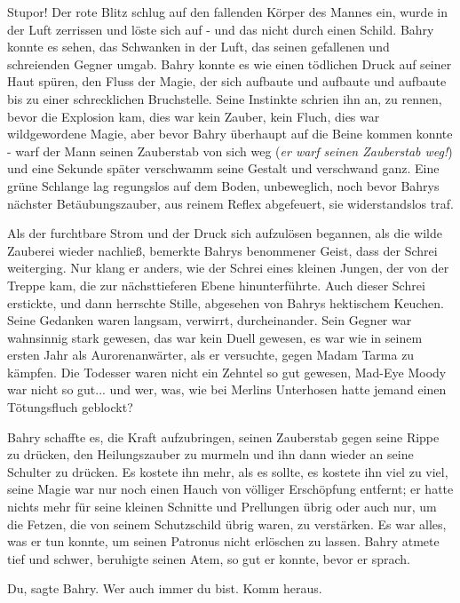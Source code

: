 \glqq{}Stupor!\grqq{} Der rote Blitz schlug auf den fallenden Körper des Mannes ein,
wurde in der Luft zerrissen und löste sich auf - und das nicht durch einen
Schild. Bahry konnte es sehen, das Schwanken in der Luft, das seinen gefallenen
und schreienden Gegner umgab. Bahry konnte es wie einen tödlichen Druck auf
seiner Haut spüren, den Fluss der Magie, der sich aufbaute und aufbaute und
aufbaute bis zu einer schrecklichen Bruchstelle. Seine Instinkte schrien ihn an,
zu rennen, bevor die Explosion kam, dies war kein Zauber, kein Fluch, dies war
wildgewordene Magie, aber bevor Bahry überhaupt auf die Beine kommen konnte -
warf der Mann seinen Zauberstab von sich weg (\emph{er warf seinen Zauberstab
weg!}) und eine Sekunde später verschwamm seine Gestalt und verschwand ganz.
Eine grüne Schlange lag regungslos auf dem Boden, unbeweglich, noch bevor Bahrys
nächster Betäubungszauber, aus reinem Reflex abgefeuert, sie widerstandslos
traf.

Als der furchtbare Strom und der Druck sich aufzulösen begannen, als die wilde
Zauberei wieder nachließ, bemerkte Bahrys benommener Geist, dass der Schrei
weiterging. Nur klang er anders, wie der Schrei eines kleinen Jungen, der von
der Treppe kam, die zur nächsttieferen Ebene hinunterführte. Auch dieser Schrei
erstickte, und dann herrschte Stille, abgesehen von Bahrys hektischem Keuchen.
Seine Gedanken waren langsam, verwirrt, durcheinander. Sein Gegner war
wahnsinnig stark gewesen, das war kein Duell gewesen, es war wie in seinem
ersten Jahr als Aurorenanwärter, als er versuchte, gegen Madam Tarma zu kämpfen.
Die Todesser waren nicht ein Zehntel so gut gewesen, Mad-Eye Moody war nicht so
gut... und wer, was, wie bei Merlins Unterhosen hatte jemand einen Tötungsfluch
geblockt?

Bahry schaffte es, die Kraft aufzubringen, seinen Zauberstab gegen seine Rippe
zu drücken, den Heilungszauber zu murmeln und ihn dann wieder an seine Schulter
zu drücken. Es kostete ihn mehr, als es sollte, es kostete ihn viel zu viel,
seine Magie war nur noch einen Hauch von völliger Erschöpfung entfernt; er hatte
nichts mehr für seine kleinen Schnitte und Prellungen übrig oder auch nur, um
die Fetzen, die von seinem Schutzschild übrig waren, zu verstärken. Es war
alles, was er tun konnte, um seinen Patronus nicht erlöschen zu lassen. Bahry
atmete tief und schwer, beruhigte seinen Atem, so gut er konnte, bevor er
sprach.

\glqq{}Du\grqq{}, sagte Bahry. \glqq{}Wer auch immer du bist. Komm heraus.\grqq{}


